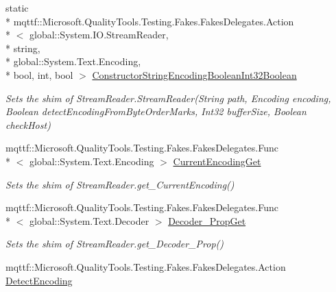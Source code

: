 \begin{DoxyCompactItemize}
static \\*
mqttf\-::\-Microsoft.\-Quality\-Tools.\-Testing.\-Fakes.\-Fakes\-Delegates.\-Action\\*
$<$ global\-::\-System.\-I\-O.\-Stream\-Reader, \\*
string, \\*
global\-::\-System.\-Text.\-Encoding, \\*
bool, int, bool $>$ \hyperlink{class_system_1_1_i_o_1_1_fakes_1_1_shim_stream_reader_aa4499d737326afe62c6094239b32c5fe}{Constructor\-String\-Encoding\-Boolean\-Int32\-Boolean}
\begin{DoxyCompactList}\small\item\em Sets the shim of Stream\-Reader.\-Stream\-Reader(\-String path, Encoding encoding, Boolean detect\-Encoding\-From\-Byte\-Order\-Marks, Int32 buffer\-Size, Boolean check\-Host)\end{DoxyCompactList}\item 
mqttf\-::\-Microsoft.\-Quality\-Tools.\-Testing.\-Fakes.\-Fakes\-Delegates.\-Func\\*
$<$ global\-::\-System.\-Text.\-Encoding $>$ \hyperlink{class_system_1_1_i_o_1_1_fakes_1_1_shim_stream_reader_aea1b7de4f82394afa402bd6e9e1b8580}{Current\-Encoding\-Get}
\begin{DoxyCompactList}\small\item\em Sets the shim of Stream\-Reader.\-get\-\_\-\-Current\-Encoding()\end{DoxyCompactList}\item 
mqttf\-::\-Microsoft.\-Quality\-Tools.\-Testing.\-Fakes.\-Fakes\-Delegates.\-Func\\*
$<$ global\-::\-System.\-Text.\-Decoder $>$ \hyperlink{class_system_1_1_i_o_1_1_fakes_1_1_shim_stream_reader_a7bf372eb6860b79cf55c79d3e32bdc84}{Decoder\-\_\-\-Prop\-Get}
\begin{DoxyCompactList}\small\item\em Sets the shim of Stream\-Reader.\-get\-\_\-\-Decoder\-\_\-\-Prop()\end{DoxyCompactList}\item 
mqttf\-::\-Microsoft.\-Quality\-Tools.\-Testing.\-Fakes.\-Fakes\-Delegates.\-Action \hyperlink{class_system_1_1_i_o_1_1_fakes_1_1_shim_stream_reader_a9ca01682013d697db472af9f0a5e5e41}{Detect\-Encoding}

\end{DoxyCompactItemize}
